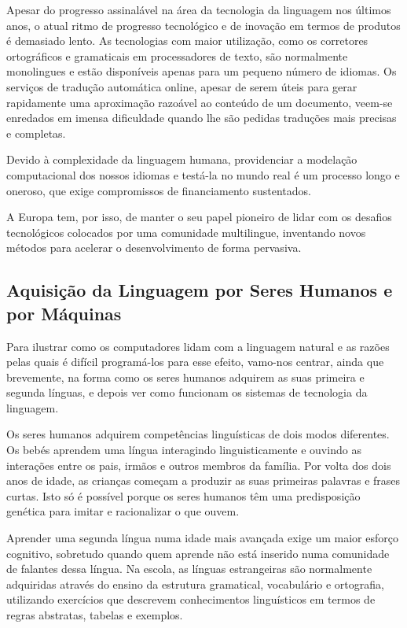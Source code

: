 \begin{multicols}{2}
Apesar do progresso assinalável na área da tecnologia da linguagem nos últimos anos, o atual ritmo de progresso tecnológico e de inovação em termos de produtos 
é demasiado lento. As tecnologias com maior utilização, como os corretores ortográficos e gramaticais em processadores de texto, são normalmente 
monolingues e estão disponíveis apenas para um pequeno número de idiomas. Os serviços de tradução automática online, apesar de serem úteis para 
gerar rapidamente uma aproximação razoável ao conteúdo de um documento, veem-se enredados em imensa dificuldade quando lhe são pedidas 
traduções mais precisas e completas. 


Devido à complexidade da linguagem humana, 
providenciar a modelação computacional dos nossos idiomas e testá-la no mundo real 
é um processo longo e oneroso, que exige compromissos de financiamento sustentados.

A Europa tem, por isso, de manter o seu papel pioneiro de lidar com os desafios tecnológicos colocados por uma comunidade multilingue, 
inventando novos métodos para acelerar o desenvolvimento de forma pervasiva.

\subsection{Aquisição da Linguagem por Seres Humanos e por Máquinas}

 Para ilustrar como os computadores lidam com a linguagem natural e as razões pelas quais é difícil pro\-gra\-má-los para esse efeito, vamo-nos centrar, ainda que brevemente, na forma como os seres humanos adquirem as suas primeira e segunda línguas, e depois ver como funcionam os sistemas de tecnologia da linguagem.

Os seres humanos adquirem competências linguísticas de dois modos diferentes. Os bebés aprendem uma língua interagindo linguisticamente e ouvindo as interações entre os pais, irmãos e outros membros da família. Por volta dos dois anos de idade, as crianças começam a produzir as suas primeiras palavras e frases curtas. Isto só é possível porque os seres humanos têm uma predisposição genética para imitar e racionalizar o que ouvem.

Aprender uma segunda língua numa idade mais avançada exige um maior esforço cognitivo, sobretudo quando quem aprende não está inserido numa comunidade de falantes dessa língua. Na escola, as línguas estrangeiras são normalmente adquiridas através do ensino da estrutura gramatical, vocabulário e ortografia, utilizando exercícios que descrevem conhecimentos linguísticos em termos de regras abstratas, tabelas e exemplos.


\end{multicols}
